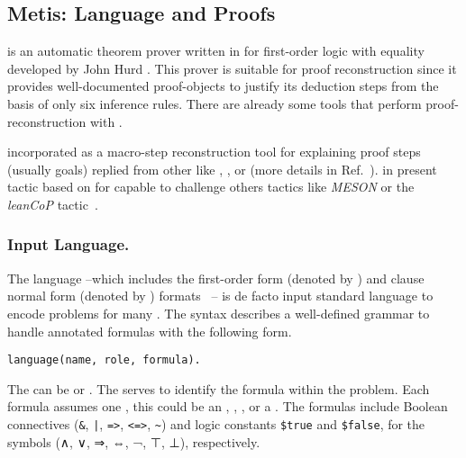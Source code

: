 \documentclass[../main.tex]{subfiles}
\begin{document}

\subsection{Metis: Language and Proofs}
\label{ssec:metis-language-and-proofs}

\Metis is an automatic theorem prover written in 
for first-order logic with equality developed by John Hurd
\cite{hurd2003first}. This prover is suitable for proof
reconstruction since it provides well-documented proof-objects to
justify its deduction steps from the basis of only six inference
rules. There are already some tools that perform proof-reconstruction
with \Metis. %

 incorporated \Metis as a macro-step
reconstruction tool for explaining proof steps (usually \CNF goals)
replied from other \ATPs like , , or
 (more details in Ref.~\cite{paulson2007source}).
\citeauthor{Farber2015} in \cite{Farber2015} present tactic based on \Metis for
 capable to challenge others tactics like \emph{MESON}
or the \emph{leanCoP} tactic~\cite{Farber2016}.


\subsubsection{Input Language.}
\label{ssec:input-language}

The \TPTP language --which includes the first-order
form (denoted by ) and clause normal form (denoted by
) formats~\cite{sutcliffe2009} -- is de facto input
standard language to encode problems for many \ATPs. The \TPTP
syntax describes a well-defined grammar to handle annotated formulas
with the following form.

\begin{verbatim}
language(name, role, formula).
\end{verbatim}

The  can be  or . The 
serves to identify the formula within the problem. Each formula
assumes one , this could be an ,
, , or a .
The formulas include Boolean connectives (\verb!&!, \verb!|!,
\verb!=>!, \verb!<=>!, \verb!~!) and logic constants \verb!$true!
and \verb!$false!, for the symbols (∧, ∨, ⇒, ⇔, ¬, ⊤, ⊥), respectively.
\end{document}

